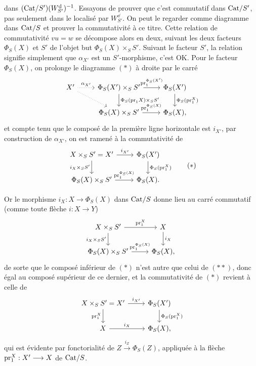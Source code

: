 \dgrchunkbegin


dans $(\mathrm{Cat}/S')(W^{\mathrm{d}}_{S'})^{-1}$. Essayons de prouver que c'est commutatif dans $\mathrm{Cat}/S'$, pas seulement dans le localisé par $W^{\dd}_{S'}$. On peut le regarder comme diagramme dans $\mathrm{Cat}/S$ et prouver la commutativité à ce titre. Cette relation de commutativité $vu = w$ se décompose alors en deux, suivant les deux facteurs $\Phi_S(X)$ et $S'$ de l'objet but $\Phi_S(X) \times_S S'$. Suivant le facteur $S'$, la relation signifie simplement que $\alpha_{X'}$ est un $S'$-morphisme, c'est OK. Pour le facteur $\Phi_S(X)$, on prolonge le diagramme $(*)$ à droite par le carré
\[
\begin{tikzcd}
X' \arrow[r, dotted, "\alpha_{X'}"] \arrow[dr, dotted] & \Phi_S(X') \times_S S' \arrow[r, "\pr_1^{\Phi_S(X')}"] \arrow[d, "\Phi_S(\pr_1 X)\times_S S'"] & \Phi_S(X') \arrow[d, "\Phi_S(\pr_1^X)"] \\
 & \Phi_S(X) \times_S S' \arrow[r, "\pr_1^{\Phi_S(X)}"] & \Phi_S(X),
\end{tikzcd}
\] %
et compte tenu que le composé de la première ligne horizontale est $i_{X'}$, par construction de $\alpha_{X'}$, on est ramené à la commutativité de
\[
\begin{tikzcd}
X \times_S S' = X' \arrow[r, "i_{X'}"] \arrow[d, "i_X\times_S S'"'] & \Phi_S(X') \arrow[d, "\Phi_S(\pr_1^X)"] \\
\Phi_S(X) \times_S S' \arrow[r, "\pr_1^{\Phi_S(X)}"] & \Phi_S(X).
\end{tikzcd}
\tag*{$(*)$}
\]

Or le morphisme $i_X : X \longrightarrow \Phi_S(X)$ dans $\mathrm{Cat}/S$ donne lieu au carré commutatif (comme toute flèche $i : X \longrightarrow Y$)
\[
\begin{tikzcd}
X \times_S S' \arrow[r, "\pr_1^X"] \arrow[d, "i_X\times_S S'"'] & X \arrow[d, "i_X"] \\
\Phi_S(X) \times_S S' \arrow[r, "\pr_1^{\Phi_S(X)}"] & \Phi_S(X),
\end{tikzcd}
\]
de sorte que le composé inférieur de $(*)$ n'est autre que celui de $(**)$, donc égal au composé supérieur de ce dernier, et la commutativité de $(*)$ revient à celle de
\[
\begin{tikzcd}
X \times_S S' = X' \arrow[r, "i_{X'}"] \arrow[d, "\pr_1^X"'] & \Phi_S(X') \arrow[d, "\Phi_S(\pr_1^X)"] \\
X \arrow[r, "i_X"] & \Phi_S(X),
\end{tikzcd}
\]
qui est évidente par fonctorialité de $Z \xrightarrow{i_Z} \Phi_S(Z)$, appliquée à la flèche $\mathrm{pr}_1^X : X' \longrightarrow X$ de $\mathrm{Cat}/S$.


